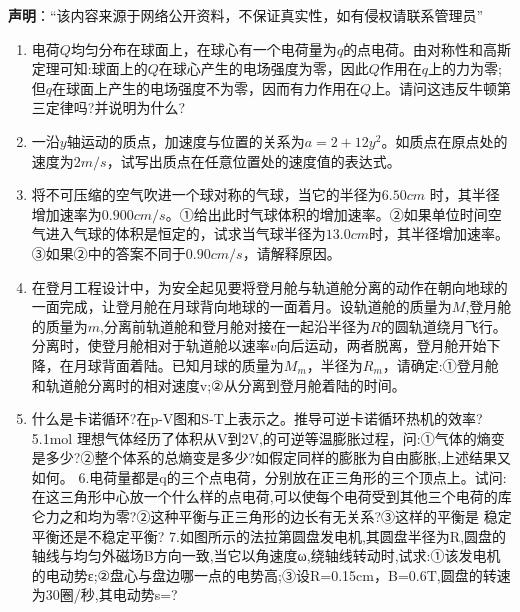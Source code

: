 
\textbf{声明}：“该内容来源于网络公开资料，不保证真实性，如有侵权请联系管理员”
\begin{enumerate}
\item 电荷$Q$均匀分布在球面上，在球心有一个电荷量为$q$的点电荷。由对称性和高斯定理可知:球面上的$Q$在球心产生的电场强度为零，因此$Q$作用在$q$上的力为零;但$q$在球面上产生的电场强度不为零，因而有力作用在$Q$上。请问这违反牛顿第三定律吗?并说明为什么?
\item 一沿$y$轴运动的质点，加速度与位置的关系为$a=2+12y^2$。如质点在原点处的速度为$2m/s$，试写出质点在任意位置处的速度值的表达式。
\item 将不可压缩的空气吹进一个球对称的气球，当它的半径为$6.50cm$ 时，其半径增加速率为$0.900cm/s$。①给出此时气球体积的增加速率。②如果单位时间空气进入气球的体积是恒定的，试求当气球半径为$13.0cm$时，其半径增加速率。③如果②中的答案不同于$0.90cm/s$，请解释原因。
\item 在登月工程设计中，为安全起见要将登月舱与轨道舱分离的动作在朝向地球的一面完成，让登月舱在月球背向地球的一面着月。设轨道舱的质量为$M$,登月舱的质量为$m$,分离前轨道舱和登月舱对接在一起沿半径为$R$的圆轨道绕月飞行。分离时，使登月舱相对于轨道舱以速率$v$向后运动，两者脱离，登月舱开始下降，在月球背面着陆。已知月球的质量为$M_m$，半径为$R_m$，请确定:①登月舱和轨道舱分离时的相对速度v;②从分离到登月舱着陆的时间。
\item 什么是卡诺循环?在p-V图和S-T上表示之。推导可逆卡诺循环热机的效率?
5.1mol 理想气体经历了体积从V到2V,的可逆等温膨胀过程，问:①气体的熵变是多少?②整个体系的总熵变是多少?如假定同样的膨胀为自由膨胀,上述结果又如何。
6.电荷量都是q的三个点电荷，分别放在正三角形的三个顶点上。试问:在这三角形中心放一个什么样的点电荷,可以使每个电荷受到其他三个电荷的库仑力之和均为零?②这种平衡与正三角形的边长有无关系?③这样的平衡是
稳定平衡还是不稳定平衡?
7.如图所示的法拉第圆盘发电机,其圆盘半径为R,圆盘的轴线与均匀外磁场B方向一致,当它以角速度ω,绕轴线转动时,试求:①该发电机的电动势ε;②盘心与盘边哪一点的电势高;③设R=0.15cm，B=0.6T,圆盘的转速为30圈/秒,其电动势s=?
\end{enumerate}
